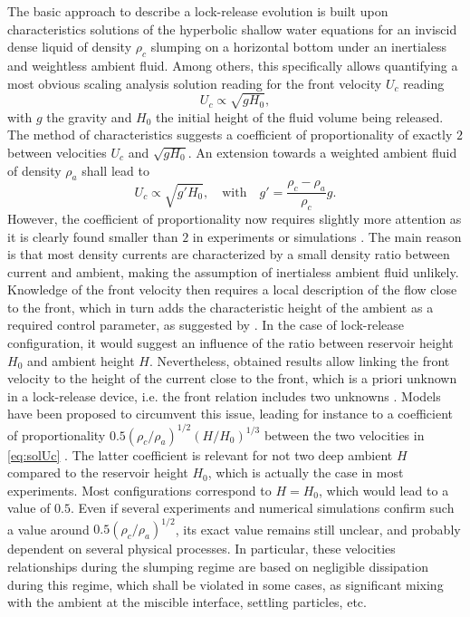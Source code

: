 \documentclass[twocolumn]{article}
\begin{document}
The basic approach to describe a lock-release evolution is built upon characteristics solutions of the hyperbolic shallow water equations for an inviscid dense liquid of density $\rho_c$ slumping on a horizontal bottom under an inertialess and weightless ambient fluid. Among others, this specifically allows quantifying a most obvious scaling analysis solution reading for the front velocity $U_c$ reading
\begin{equation}
	U_c\propto \sqrt{gH_0},
\end{equation}
with $g$ the gravity and $H_0$ the initial height of the fluid volume being released. The method of characteristics suggests a coefficient of proportionality of exactly $2$ between velocities $U_c$ and $\sqrt{gH_0}$. An extension towards a weighted ambient fluid of density $\rho_a$ shall lead to
\begin{equation}
	U_c\propto \sqrt{g'H_0},\quad\mbox{with}\quad g'=\frac{\rho_c-\rho_a}{\rho_c}g.
	\label{eq:solUc}
\end{equation}
However, the coefficient of proportionality now requires slightly more attention as it is clearly found smaller than $2$ in experiments or simulations \citep{??}. The main reason is that most density currents are characterized by a small density ratio between current and ambient, making the assumption of inertialess ambient fluid unlikely.
Knowledge of the front velocity then requires a local description of the flow close to the front, which in turn adds the characteristic height of the ambient as a required control parameter, as suggested by \citet{Benjamin1968}.
In the case of lock-release configuration, it would suggest an influence of the ratio between reservoir height $H_0$ and ambient height $H$.
Nevertheless, obtained results allow linking the front velocity to the height of the current close to the front, which is a priori unknown in a lock-release device, i.e. the front relation includes two unknowns \citep{Benjamin1968}. Models have been proposed to circumvent this issue, leading for instance to a coefficient of proportionality $0.5 (\rho_c/\rho_a)^{1/2}(H/H_0)^{1/3}$ between the two velocities in \eqref{eq:solUc} \citep{Huppert1980}. The latter coefficient is relevant for not two deep ambient $H$ compared to the reservoir height $H_0$, which is actually the case in most experiments. Most configurations correspond to $H=H_0$, which would lead to a value of $0.5$. Even if several experiments and numerical simulations confirm such a value around $0.5(\rho_c/\rho_a)^{1/2}$, its exact value remains still unclear, and probably dependent on several physical processes. In particular, these velocities relationships during the slumping regime are based on negligible dissipation during this regime, which shall be violated in some cases, as significant mixing with the ambient at the miscible interface,  settling particles, etc.
\end{document}
